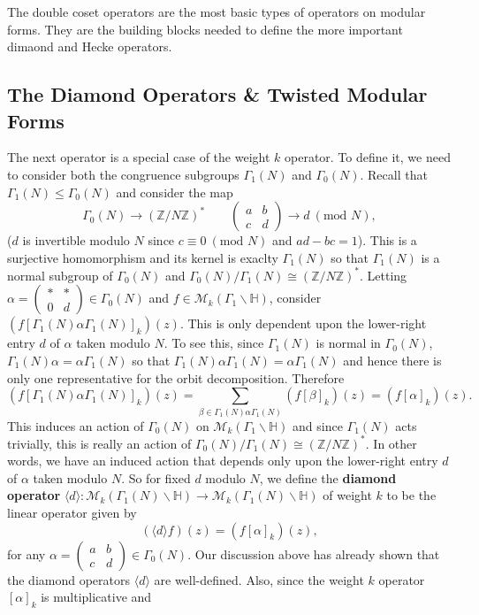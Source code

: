 \documentclass[12pt]{book}
\theoremstyle{definition}\newframedtheorem{method}{Method}
\newcommand{\tmod}[1]{\ \left(\text{mod }#1\right)}
\newcommand{\mc}{\mathcal}
\newcommand{\Z}{\mathbb{Z}}
\renewcommand{\H}{\mathbb{H}}
\renewcommand{\a}{\alpha}
\renewcommand{\b}{\beta}
\newcommand{\G}{\Gamma}
\newcommand{\<}{\langle}
\renewcommand{\>}{\rangle}
\begin{document}
      The double coset operators are the most basic types of operators on modular forms. They are the building blocks needed to define the more important dimaond and Hecke operators.
    \subsection*{The Diamond Operators \& Twisted Modular Forms}
      The next operator is a special case of the weight $k$ operator. To define it, we need to consider both the congruence subgroups $\G_{1}(N)$ and $\G_{0}(N)$. Recall that $\G_{1}(N) \le \G_{0}(N)$ and consider the map
      \[
        \G_{0}(N) \to (\Z/N\Z)^{\ast} \qquad \begin{pmatrix} a & b \\ c & d\end{pmatrix} \to d \tmod{N},
      \]
      ($d$ is invertible modulo $N$ since $c \equiv 0 \tmod{N}$ and $ad-bc = 1$). This is a surjective homomorphism and its kernel is exaclty $\G_{1}(N)$ so that $\G_{1}(N)$ is a normal subgroup of $\G_{0}(N)$ and $\G_{0}(N)/\G_{1}(N) \cong (\Z/N\Z)^{\ast}$. Letting $\a = \begin{pmatrix} \ast & \ast \\ 0 & d \end{pmatrix} \in \G_{0}(N)$ and $f \in \mc{M}_{k}(\G_{1}\backslash\H)$, consider $\left(f\left[\G_{1}(N)\a\G_{1}(N)\right]_{k}\right)(z)$. This is only dependent upon the lower-right entry $d$ of $\a$ taken modulo $N$. To see this, since $\G_{1}(N)$ is normal in $\G_{0}(N)$, $\G_{1}(N)\a = \a\G_{1}(N)$ so that $\G_{1}(N)\a\G_{1}(N) = \a\G_{1}(N)$ and hence there is only one representative for the orbit decomposition. Therefore
      \[
        \left(f\left[\G_{1}(N)\a\G_{1}(N)\right]_{k}\right)(z) = \sum_{\b \in \G_{1}(N)\a\G_{1}(N)}(f[\b]_{k})(z) = (f[\a]_{k})(z).
      \]
      This induces an action of $\G_{0}(N)$ on $\mc{M}_{k}(\G_{1}\backslash\H)$ and since $\G_{1}(N)$ acts trivially, this is really an action of $\G_{0}(N)/\G_{1}(N) \cong (\Z/N\Z)^{\ast}$. In other words, we have an induced action that depends only upon the lower-right entry $d$ of $\a$ taken modulo $N$. So for fixed $d$ modulo $N$, we define the \textbf{diamond operator} $\<d\>:\mc{M}_{k}(\G_{1}(N)\backslash\H) \to \mc{M}_{k}(\G_{1}(N)\backslash\H)$ of weight $k$ to be the linear operator given by
      \[
        (\<d\>f)(z) = (f[\a]_{k})(z),
      \]
      for any $\a = \begin{pmatrix} a & b \\ c & d \end{pmatrix} \in \G_{0}(N)$. Our discussion above has already shown that the diamond operators $\<d\>$ are well-defined. Also, since the weight $k$ operator $[\a]_{k}$ is multiplicative and
\end{document}
